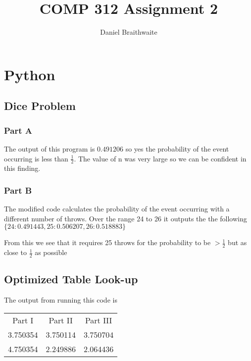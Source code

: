 \documentclass{article}
\title{COMP 312 Assignment 2}
\author{Daniel Braithwaite}
\begin{document}
	\maketitle
	\newpage
  	
  	\section{Python}
  		\subsection{Dice Problem}
  			\subsubsection{Part A}
  				
  				
  				The output of this program is $0.491206$ so yes the probability of the event occurring is less than $\frac{1}{2}$. The value of n was very large so we can be confident in this finding.
  				
  			\subsubsection{Part B}
  				
  				
  				The modified code calculates the probability of the event occurring with a different number of throws. Over the range 24 to 26 it outputs the the following $\{24: 0.491443, 25: 0.506207, 26: 0.518883\}$
  				
  				From this we see that it requires 25 throws for the probability to be $ > \frac{1}{2}$ but as close to $\frac{1}{2}$ as possible
  				
  				
  		\subsection{Optimized Table Look-up}
  			
			
			The output from running this code is
			\newline
			
			\begin{center}
				\begin{tabular}{ c c c}
				Part I & Part II & Part III\\
				3.750354 & 3.750114 & 3.750704\\
				4.750354 & 2.249886 & 2.064436\\
				
				\end{tabular}
			\end{center}						
			
\end{document}
